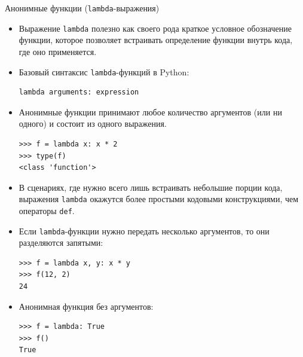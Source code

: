 \documentclass[aspectratio=169, mathserif]{beamer}	%
\begin{document}
\begin{frame}[fragile]{Анонимные функции (\texttt{lambda}-выражения)}
\scriptsize
\begin{itemize}
	\item Выражение \texttt{lambda} полезно как своего рода краткое условное обозначение функции,
	которое позволяет встраивать определение функции внутрь кода, где оно применяется.
	\item Базовый синтаксис \texttt{lambda}-функций в Python:
\begin{lstlisting}[language=iPython, numbers=none, frame=none, ]
lambda arguments: expression
\end{lstlisting}	
\item Анонимные функции принимают любое количество аргументов (или ни одного) и состоит из одного выражения.
\begin{lstlisting}[language=iPython, numbers=none, frame=none, ]
>>> f = lambda x: x * 2
>>> type(f)
<class 'function'>
\end{lstlisting}	
\item В сценариях, где нужно всего лишь встраивать небольшие порции кода, выражения
\texttt{lambda} окажутся более простыми кодовыми конструкциями, чем операторы \texttt{def}.
\item Если \texttt{lambda}-функции нужно передать несколько аргументов, то они разделяются запятыми:
\begin{lstlisting}[language=iPython, numbers=none, frame=none, ]
>>> f = lambda x, y: x * y
>>> f(12, 2)
24
\end{lstlisting}	
\item Анонимная функция без аргументов:
\begin{lstlisting}[language=iPython, numbers=none, frame=none, ]
>>> f = lambda: True
>>> f()
True
\end{lstlisting}
\end{itemize}
\vfill
\end{frame}
\end{document}
